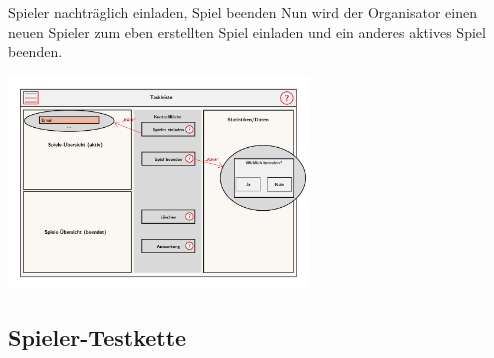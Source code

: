 \documentclass[xcolor=dvipsnames]{beamer}
\begin{document}
    \begin{frame}
        \begin{block} {Spieler nachträglich einladen, Spiel beenden}
            Nun wird der Organisator einen neuen Spieler zum eben erstellten Spiel einladen und ein anderes aktives Spiel beenden.
        \end{block}
        \includegraphics[width=8cm]{img/OrganisatorPres2.jpg}
    \end{frame}
    \subsection{Spieler-Testkette}
\end{document}
